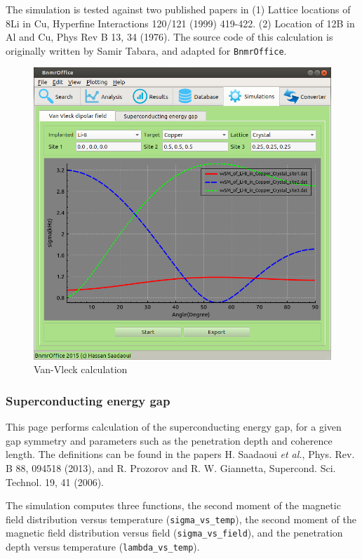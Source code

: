 \documentclass[10pt,letterpaper,oneside]{article}
\newcommand{\bof}{\texttt{BnmrOffice}}
\newcommand{\etal}{{\it et al.}}
\begin{document}
The simulation is tested against two published papers in (1) Lattice locations of 8Li in Cu, Hyperfine Interactions 120/121 (1999) 419-422. (2) Location of 12B in Al and Cu, Phys Rev B 13, 34 (1976). The source code of this calculation is originally written by Samir Tabara, and adapted for \bof.
\begin{figure}[h]
\center
\includegraphics[width=\textwidth]{sim-vv.png}
 \caption{Van-Vleck calculation}
 \label{fig-mag}
 \end{figure}

 \clearpage

\subsubsection{Superconducting energy gap}
This page performs calculation of the superconducting energy gap, for a given gap symmetry and parameters such as the penetration depth and coherence length. The definitions can be found in the papers 
H. Saadaoui \etal, Phys. Rev. B 88, 094518 (2013), and
R. Prozorov and R. W. Giannetta, Supercond. Sci. Technol. 19, 41 (2006). 

The simulation computes three functions, the second moment of the magnetic field distribution versus temperature (\verb+sigma_vs_temp+), the second moment of the magnetic field distribution versus field (\verb+sigma_vs_field+), and the penetration depth versus temperature (\verb+lambda_vs_temp+).
\end{document}
